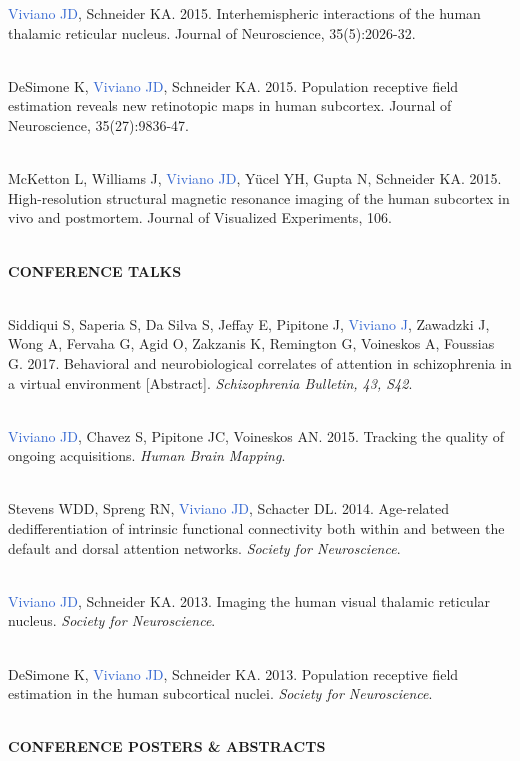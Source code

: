 \documentclass[a4paper,11pt,oneside]{book}
\newcommand\sectionheading{
    \normalsize
    \noindent
    \leftskip=0in
    \textbf
}
\begin{document}
\begin{flushleft}
\textcolor{highlight}{Viviano JD}, Schneider KA. 2015. Interhemispheric interactions of the human thalamic reticular nucleus. Journal of Neuroscience, 35(5):2026-32. \\\

DeSimone K, \textcolor{highlight}{Viviano JD}, Schneider KA. 2015. Population receptive field estimation reveals new retinotopic maps in human subcortex. Journal of Neuroscience, 35(27):9836-47. \\\

McKetton L, Williams J, \textcolor{highlight}{Viviano JD}, Yücel YH, Gupta N, Schneider KA. 2015. High-resolution structural magnetic resonance imaging of the human subcortex in vivo and postmortem. Journal of Visualized Experiments, 106. \\\

\sectionheading{CONFERENCE TALKS} \\\

Siddiqui S, Saperia S, Da Silva S, Jeffay E, Pipitone J, \textcolor{highlight}{Viviano J}, Zawadzki J, Wong A, Fervaha G, Agid O, Zakzanis K, Remington G, Voineskos A, Foussias G. 2017. Behavioral and neurobiological correlates of attention in schizophrenia in a virtual environment [Abstract]. \textit{Schizophrenia Bulletin, 43, S42}. \\\

\textcolor{highlight}{Viviano JD}, Chavez S, Pipitone JC, Voineskos AN. 2015. Tracking the quality of ongoing acquisitions. \textit{Human Brain Mapping}. \\\

Stevens WDD, Spreng RN, \textcolor{highlight}{Viviano JD}, Schacter DL. 2014. Age-related dedifferentiation of intrinsic functional connectivity both within and between the default and dorsal attention networks. \textit{Society for Neuroscience}. \\\

\textcolor{highlight}{Viviano JD}, Schneider KA. 2013. Imaging the human visual thalamic reticular nucleus. \textit{Society for Neuroscience}. \\\

DeSimone K, \textcolor{highlight}{Viviano JD}, Schneider KA. 2013. Population receptive field estimation in the human subcortical nuclei. \textit{Society for Neuroscience}. \\\

\sectionheading{CONFERENCE POSTERS \& ABSTRACTS} \\\


\end{flushleft}
\end{document}
